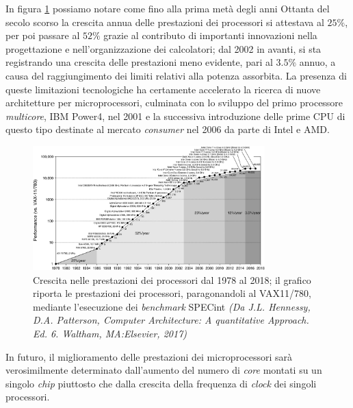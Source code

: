 In figura \ref{fig:PrestazioniProcessori} possiamo notare come fino alla prima met\`a degli anni Ottanta del secolo scorso la crescita annua delle prestazioni dei processori si attestava al $25\%$, per poi passare al $52\%$ grazie al contributo di importanti innovazioni nella progettazione e nell'organizzazione dei calcolatori; dal 2002 in avanti, si sta registrando una crescita delle prestazioni meno evidente, pari al $3.5\%$ annuo, a causa del raggiungimento dei limiti relativi alla potenza assorbita.\newline
La presenza di queste limitazioni tecnologiche ha certamente accelerato la ricerca di nuove architetture per microprocessori, culminata con lo sviluppo del primo processore \textit{multicore}, IBM Power4, nel 2001 e la successiva introduzione delle prime CPU di questo tipo destinate al mercato \textit{consumer} nel 2006 da parte di Intel e AMD.
\begin{figure}[htbp]
    \centering
    \includegraphics[width=0.8\textwidth]{../Immagini/Capitolo 1/PrestazioniProcessori}
    \caption{Crescita nelle prestazioni dei processori dal 1978 al 2018; il grafico riporta le prestazioni dei processori, paragonandoli al VAX11/780, mediante l'esecuzione dei \textit{benchmark} SPECint \small{\textit{(Da J.L. Hennessy, D.A. Patterson, Computer Architecture: A quantitative Approach. Ed. 6. Waltham, MA:Elsevier, 2017)}}}
    \label{fig:PrestazioniProcessori}
\end{figure}

In futuro, il miglioramento delle prestazioni dei microprocessori sar\`a verosimilmente determinato dall'aumento del numero di \textit{core} montati su un singolo \textit{chip} piuttosto che dalla crescita della frequenza di \textit{clock} dei singoli processori.